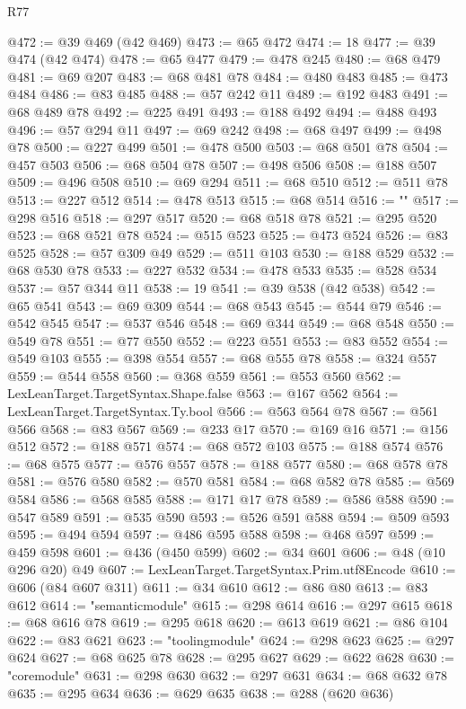\begin{lexlean}{R77}
\begin{coremodule}
{@472 := @39 @469 (@42 @469)
@473 := @65 @472
@474 := 18
@477 := @39 @474 (@42 @474)
@478 := @65 @477
@479 := @478 @245
@480 := @68 @479
@481 := @69 @207
@483 := @68 @481 @78
@484 := @480 @483
@485 := @473 @484
@486 := @83 @485
@488 := @57 @242 @11
@489 := @192 @483
@491 := @68 @489 @78
@492 := @225 @491
@493 := @188 @492
@494 := @488 @493
@496 := @57 @294 @11
@497 := @69 @242
@498 := @68 @497
@499 := @498 @78
@500 := @227 @499
@501 := @478 @500
@503 := @68 @501 @78
@504 := @457 @503
@506 := @68 @504 @78
@507 := @498 @506
@508 := @188 @507
@509 := @496 @508
@510 := @69 @294
@511 := @68 @510
@512 := @511 @78
@513 := @227 @512
@514 := @478 @513
@515 := @68 @514
@516 := "{"
@517 := @298 @516
@518 := @297 @517
@520 := @68 @518 @78
@521 := @295 @520
@523 := @68 @521 @78
@524 := @515 @523
@525 := @473 @524
@526 := @83 @525
@528 := @57 @309 @49
@529 := @511 @103
@530 := @188 @529
@532 := @68 @530 @78
@533 := @227 @532
@534 := @478 @533
@535 := @528 @534
@537 := @57 @344 @11
@538 := 19
@541 := @39 @538 (@42 @538)
@542 := @65 @541
@543 := @69 @309
@544 := @68 @543
@545 := @544 @79
@546 := @542 @545
@547 := @537 @546
@548 := @69 @344
@549 := @68 @548
@550 := @549 @78
@551 := @77 @550
@552 := @223 @551
@553 := @83 @552
@554 := @549 @103
@555 := @398 @554
@557 := @68 @555 @78
@558 := @324 @557
@559 := @544 @558
@560 := @368 @559
@561 := @553 @560
@562 := LexLeanTarget.TargetSyntax.Shape.false
@563 := @167 @562
@564 := LexLeanTarget.TargetSyntax.Ty.bool
@566 := @563 @564 @78
@567 := @561 @566
@568 := @83 @567
@569 := @233 @17
@570 := @169 @16
@571 := @156 @512
@572 := @188 @571
@574 := @68 @572 @103
@575 := @188 @574
@576 := @68 @575
@577 := @576 @557
@578 := @188 @577
@580 := @68 @578 @78
@581 := @576 @580
@582 := @570 @581
@584 := @68 @582 @78
@585 := @569 @584
@586 := @568 @585
@588 := @171 @17 @78
@589 := @586 @588
@590 := @547 @589
@591 := @535 @590
@593 := @526 @591 @588
@594 := @509 @593
@595 := @494 @594
@597 := @486 @595 @588
@598 := @468 @597
@599 := @459 @598
@601 := @436 (@450 @599)
@602 := @34 @601
@606 := @48 (@10 @296 @20) @49
@607 := LexLeanTarget.TargetSyntax.Prim.utf8Encode
@610 := @606 (@84 @607 @311)
@611 := @34 @610
@612 := @86 @80
@613 := @83 @612
@614 := "semanticmodule"
@615 := @298 @614
@616 := @297 @615
@618 := @68 @616 @78
@619 := @295 @618
@620 := @613 @619
@621 := @86 @104
@622 := @83 @621
@623 := "toolingmodule"
@624 := @298 @623
@625 := @297 @624
@627 := @68 @625 @78
@628 := @295 @627
@629 := @622 @628
@630 := "coremodule"
@631 := @298 @630
@632 := @297 @631
@634 := @68 @632 @78
@635 := @295 @634
@636 := @629 @635
@638 := @288 (@620 @636)
}}
\end{coremodule}
\end{lexlean}
